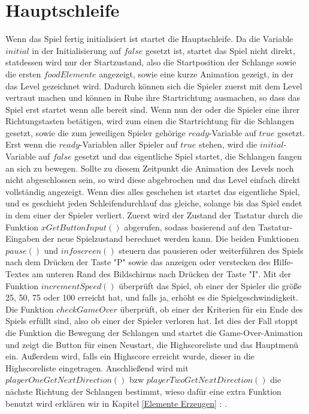 \section{Hauptschleife}
\label{Hauptschleife}
%
Wenn das Spiel fertig initialisiert ist startet die Hauptschleife. Da die Variable $initial$ in der Initialisierung auf $false$ gesetzt ist, startet das Spiel nicht direkt, statdessen wird nur der Startzustand, also die Startposition der Schlange sowie die ersten $foodElemente$ angezeigt, sowie eine kurze Animation gezeigt, in der das Level gezeichnet wird. Dadurch können sich die Spieler zuerst mit dem Level vertraut machen und können in Ruhe ihre Startrichtung ausmachen, so dass das Spiel erst startet wenn alle bereit sind. Wenn nun der oder die Spieler eine ihrer Richtungstasten betätigen, wird zum einen die Startrichtung für die Schlangen gesetzt, sowie die zum jeweiligen Spieler gehörige $ready$-Variable auf $true$ gesetzt. Erst wenn die $ready$-Variablen aller Spieler auf $true$ stehen, wird die $initial$-Variable auf $false$ gesetzt und das eigentliche Spiel startet, die Schlangen fangen an sich zu bewegen. Sollte zu diesem Zeitpunkt die Animation des Levels noch nicht abgeschlossen sein, so wird diese abgebrochen und das Level einfach direkt vollständig angezeigt.
Wenn dies alles geschehen ist startet das eigentliche Spiel, und es geschieht jeden Schleifendurchlauf das gleiche, solange bis das Spiel endet in dem einer der Spieler verliert.
Zuerst wird der Zustand der Tastatur durch die Funktion $xGetButtonInput()$ abgerufen, sodass basierend auf den Tastatur-Eingaben der neue Spielzustand berechnet werden kann. Die beiden Funktionen $pause()$ und $infoscreen()$ steuern das pausieren oder weiterführen des Spiels nach dem Drücken der Taste "P" sowie das anzeigen oder verstecken des Hilfe-Textes am unteren Rand des Bildschirms nach Drücken der Taste "I". Mit der Funktion $incrementSpeed()$ überprüft das Spiel, ob einer der Spieler die größe 25, 50, 75 oder 100 erreicht hat, und falls ja, erhöht es die Spielgeschwindigkeit. Die Funktion $checkGameOver$ überprüft, ob einer der Kriterien für ein Ende des Spiels erfüllt sind, also ob einer der Spieler verloren hat. Ist dies der Fall stoppt die Funktion die Bewegung der Schlangen und startet die Game-Over-Animation und zeigt die Button für einen Neustart, die Highscoreliste und das Hauptmenü ein. Außerdem wird, falls ein Highscore erreicht wurde, dieser in die Highscoreliste eingetragen.
Anschließend wird mit $playerOneGetNextDirection()$ bzw $playerTwoGetNextDirection()$ die nächste Richtung der Schlangen bestimmt, wieso dafür eine extra Funktion benutzt wird erklären wir in Kapitel \ref{Elemente Erzeugen}  : .
